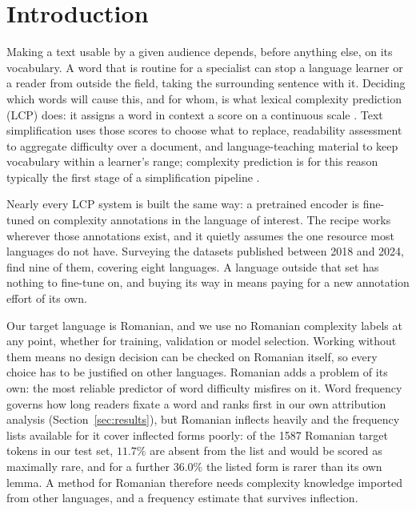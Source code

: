 
\section{Introduction}
\label{section:intro}

Making a text usable by a given audience depends, before anything else,
on its vocabulary. A word that is routine for a specialist can stop a
language learner or a reader from outside the field, taking the
surrounding sentence with it. Deciding which
words will cause this, and for whom, is what lexical complexity
prediction (LCP) does: it assigns a word in context a score on a
continuous scale \citep{shardlow-etal-2021-semeval}. Text simplification
uses those scores to choose what to replace, readability assessment to
aggregate difficulty over a document, and language-teaching material to
keep vocabulary within a learner's range; complexity prediction is for
this reason typically the first stage of a simplification pipeline
\citep{qiu-etal-2024-complex}.

Nearly every LCP system is built the same way: a pretrained encoder is
fine-tuned on complexity annotations in the language of interest. The
recipe works wherever those annotations exist, and it quietly assumes the
one resource most languages do not have. Surveying the datasets published
between 2018 and 2024, \citet{shardlow-etal-2024-multilingual} find nine
of them, covering eight languages. A language outside that set has
nothing to fine-tune on, and buying its way in means paying for a new
annotation effort of its own.

Our target language is Romanian, and we use no Romanian complexity
labels at any point, whether for training, validation or model
selection. Working without them means no design decision can be checked
on Romanian itself, so every choice has to be justified on other
languages. Romanian adds a problem of its own: the most reliable
predictor of word difficulty misfires on it. Word frequency governs how
long readers fixate a word \citep{rayner1998eye} and ranks first in our
own attribution analysis (Section~\ref{sec:results}), but Romanian
inflects heavily and the frequency lists available for it cover
inflected forms poorly: of the 1587 Romanian target tokens in our test
set, $11.7\%$ are absent from the list and would be scored as maximally
rare, and for a further $36.0\%$ the listed form is rarer than its own
lemma. A method for Romanian therefore needs complexity knowledge
imported from other languages, and a frequency estimate that survives
inflection.

